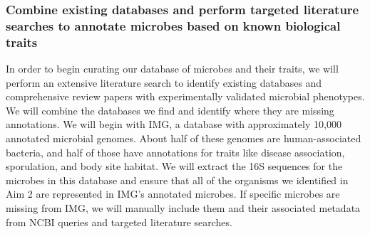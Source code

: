 \documentclass[12pt]{article}
\begin{document}

\subsubsection{Combine existing databases and perform targeted literature searches to annotate microbes based on known biological traits}\label{sec:set_curation}

In order to begin curating our database of microbes and their traits, 
we will perform an extensive literature search
to identify existing databases and comprehensive review papers with experimentally 
validated microbial phenotypes. We will combine the databases we find
and identify where they are missing annotations.
We will begin with IMG, a database with approximately 10,000 annotated microbial genomes. 
About half of these genomes are human-associated bacteria, 
and half of those have annotations for traits like disease 
association, sporulation, and body site habitat. 
We will extract the 16S sequences for the microbes in this database
and ensure that all of the organisms we identified in Aim 2
are represented in IMG's annotated microbes. If specific microbes are missing from IMG,
we will manually include them and their associated metadata from NCBI queries 
and targeted literature searches.
\end{document}
